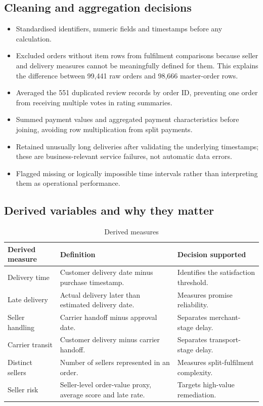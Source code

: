 \documentclass[11pt,a4paper]{article}
\begin{document}
\subsection{Cleaning and aggregation decisions}
\begin{itemize}[leftmargin=1.2cm]
    \item Standardised identifiers, numeric fields and timestamps before any calculation.
    \item Excluded orders without item rows from fulfilment comparisons because seller and delivery measures cannot be meaningfully defined for them. This explains the difference between 99,441 raw orders and 98,666 master-order rows.
    \item Averaged the 551 duplicated review records by order ID, preventing one order from receiving multiple votes in rating summaries.
    \item Summed payment values and aggregated payment characteristics before joining, avoiding row multiplication from split payments.
    \item Retained unusually long deliveries after validating the underlying timestamps; these are business-relevant service failures, not automatic data errors.
    \item Flagged missing or logically impossible time intervals rather than interpreting them as operational performance.
\end{itemize}

\subsection{Derived variables and why they matter}

\begin{table}[h]
\centering
\caption{Derived measures}
\begin{tabularx}{\textwidth}{L{2.8cm} L{5.4cm} L{5.6cm}}
\toprule
\textbf{Derived measure} & \textbf{Definition} & \textbf{Decision supported} \\
\midrule
Delivery time & Customer delivery date minus purchase timestamp. & Identifies the satisfaction threshold. \\
Late delivery & Actual delivery later than estimated delivery date. & Measures promise reliability. \\
Seller handling & Carrier handoff minus approval date. & Separates merchant-stage delay. \\
Carrier transit & Customer delivery minus carrier handoff. & Separates transport-stage delay. \\
Distinct sellers & Number of sellers represented in an order. & Measures split-fulfilment complexity. \\
Seller risk & Seller-level order-value proxy, average score and late rate. & Targets high-value remediation. \\
\bottomrule
\end{tabularx}
\end{table}
\end{document}
